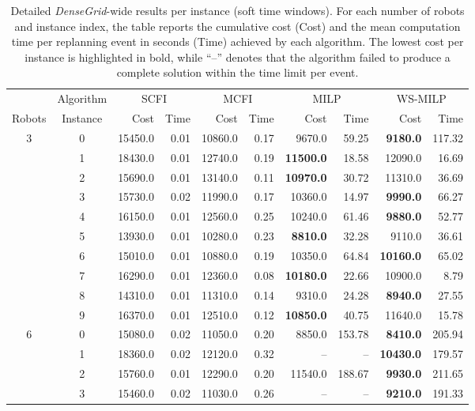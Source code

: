 {\color{red}
\begin{table}[htb!]
\centering
\caption{Detailed \textit{DenseGrid}-wide results per instance (soft time windows). For each number of robots and instance index, the table reports the cumulative cost (Cost) and the mean computation time per replanning event in seconds (Time) achieved by each algorithm. The lowest cost per instance is highlighted in bold, while ``--'' denotes that the algorithm failed to produce a complete solution within the time limit per event.}
\label{table:symmetric_grid_wide_results}
\begin{tabular}{cc|rr|rr|rr|rr}
\toprule
 & Algorithm & \multicolumn{2}{c|}{SCFI} & \multicolumn{2}{c|}{MCFI} & \multicolumn{2}{c|}{MILP} & \multicolumn{2}{c}{WS-MILP} \\
Robots & Instance & Cost & Time & Cost & Time & Cost & Time & Cost & Time \\
\midrule
3 & 0 & 15450.0 & 0.01 & 10860.0 & 0.17 & 9670.0 & 59.25 & \textbf{9180.0} & 117.32 \\
 & 1 & 18430.0 & 0.01 & 12740.0 & 0.19 & \textbf{11500.0} & 18.58 & 12090.0 & 16.69 \\
 & 2 & 15690.0 & 0.01 & 13140.0 & 0.11 & \textbf{10970.0} & 30.72 & 11310.0 & 36.69 \\
 & 3 & 15730.0 & 0.02 & 11990.0 & 0.17 & 10360.0 & 14.97 & \textbf{9990.0} & 66.27 \\
 & 4 & 16150.0 & 0.01 & 12560.0 & 0.25 & 10240.0 & 61.46 & \textbf{9880.0} & 52.77 \\
 & 5 & 13930.0 & 0.01 & 10280.0 & 0.23 & \textbf{8810.0} & 32.28 & 9110.0 & 36.61 \\
 & 6 & 15010.0 & 0.01 & 10880.0 & 0.19 & 10350.0 & 64.84 & \textbf{10160.0} & 65.02 \\
 & 7 & 16290.0 & 0.01 & 12360.0 & 0.08 & \textbf{10180.0} & 22.66 & 10900.0 & 8.79 \\
 & 8 & 14310.0 & 0.01 & 11310.0 & 0.14 & 9310.0 & 24.28 & \textbf{8940.0} & 27.55 \\
 & 9 & 16370.0 & 0.01 & 12510.0 & 0.12 & \textbf{10850.0} & 40.75 & 11640.0 & 15.78 \\ \hline
6 & 0 & 15080.0 & 0.02 & 11050.0 & 0.20 & 8850.0 & 153.78 & \textbf{8410.0} & 205.94 \\
 & 1 & 18360.0 & 0.02 & 12120.0 & 0.32 & -- & -- & \textbf{10430.0} & 179.57 \\
 & 2 & 15760.0 & 0.01 & 12290.0 & 0.20 & 11540.0 & 188.67 & \textbf{9930.0} & 211.65 \\
 & 3 & 15460.0 & 0.02 & 11030.0 & 0.26 & -- & -- & \textbf{9210.0} & 191.33 \\

\end{tabular}
\end{table}}
